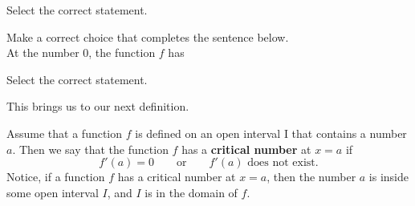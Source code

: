 \documentclass{ximera}
\begin{document}
  \begin{question}
Select the correct statement.
  \begin{multipleChoice}
  \end{multipleChoice}
\end{question}
\begin{question}
 Make a correct choice that completes the sentence below. \\
 
  At the number $0$, the function $f$ has 

  \begin{multipleChoice}
  \end{multipleChoice}
  \end{question}
  \begin{question}
Select the correct statement.
  \begin{multipleChoice}
  \end{multipleChoice}
\end{question}

This brings us to our next definition.










\begin{definition}
  Assume that a function $f$ is defined on an open interval I that contains a number $a$. Then we say that the  function $f$ has a \textbf{critical number} at $x=a$ if 
  \[
  f'(a) = 0\qquad\text{or}\qquad \text{$f'(a)$ does not exist.}
  \]
 Notice, if a function $f$ has a critical number at $x=a$, then the number $a$ is inside some open interval $I$, and $I$ is in the  domain of $f$. 
 
\end{definition}
\end{document}
